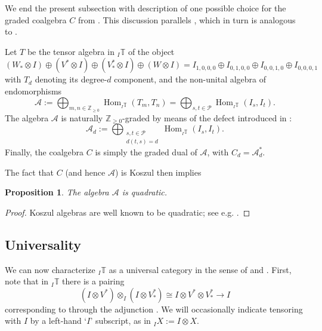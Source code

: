 \documentclass[11pt]{article}
\theoremstyle{plain}
\newtheorem{proposition}[lemma]{Proposition}
\theoremstyle{nonumberplain}
\theoremstyle{plain}
\numberwithin{equation}{section}
\theoremstyle{nonumberplain}
\newtheorem{proof}{Proof}
\newcommand\bT{{\mathbb T}}
\newcommand\bZ{{\mathbb Z}}
\newcommand\cP{{\mathcal P}}
\newcommand\1{{\bf 1}}
\DeclareMathOperator{\Hom}{\mathrm{Hom}}
\begin{document}
We end the present subsection with description of one possible choice for the graded coalgebra $C$ from . This discussion parallels \cite[\S 3.4]{us0}, which in turn is analogous to \cite[\S 5]{DPS}.



Let $T$ be the tensor algebra in ${}_I\bT$ of the object
\begin{equation*}
  (W_*\otimes I)\oplus (V^*\otimes I)\oplus (V_*^*\otimes I)\oplus (W\otimes I)  = I_{1,0,0,0}\oplus I_{0,1,0,0}\oplus I_{0,0,1,0}\oplus I_{0,0,0,1}
\end{equation*}
with $T_d$ denoting its degree-$d$ component, and the non-unital algebra of endomorphisms
\begin{equation*}
  \mathcal{A}:=\bigoplus_{m,n\in \bZ_{\ge 0}}\Hom_{{}_I\bT}(T_m,T_n)\label{eq:a}=\bigoplus_{s,t\in \cP}\Hom_{{}_I\bT}(I_s, I_t).
\end{equation*}
The algebra $\mathcal{A}$ is naturally $\bZ_{\ge 0}$-graded by means of the defect introduced in :
\begin{equation*}
  \mathcal{A}_d:=\bigoplus_{\substack{s,t\in \cP \\ d(t,s)=d}}\Hom_{{}_I\bT}(I_s, I_t).
\end{equation*}
Finally, the coalgebra $C$ is simply the graded dual of $\mathcal{A}$, with $C_d=\mathcal{A}_d^*$.

The fact that $C$ (and hence $\mathcal{A}$) is Koszul then implies

\begin{proposition}\label{pr:isquad}
  The algebra $\mathcal{A}$ is quadratic. 
\end{proposition}
\begin{proof}
  Koszul algebras are well known to be quadratic; see e.g. \cite[\S 2.3]{BGS}.
\end{proof}

\subsection{Universality}\label{subse:univ}

We can now characterize ${}_I\bT$ as a universal category in the sense of \cite[Theorem 4.23]{us0} and \cite[Theorem 5.2]{us1}. First, note that in ${}_I\bT$ there is a pairing
\begin{equation}\label{eq:pairi}
  (I\otimes V^*)\otimes_I (I\otimes V_*^*)\cong I\otimes V^*\otimes V_*^*\to I
\end{equation}
corresponding to  through the adjunction . We will occasionally indicate tensoring with $I$ by a left-hand `$I$' subscript, as in ${}_IX:= I\otimes X$.
\end{document}
